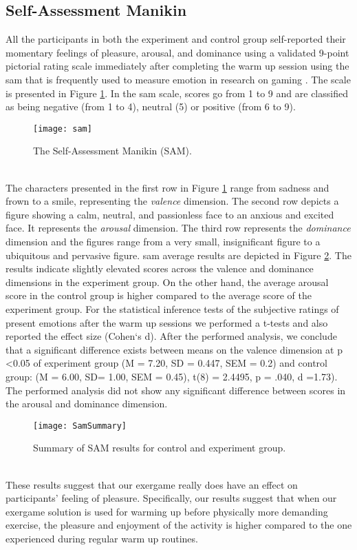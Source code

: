 \subsection{Self-Assessment Manikin}
All the participants in both the experiment and control group self-reported their momentary feelings of pleasure, arousal, and dominance using a validated 9-point pictorial rating scale immediately after completing the warm up session using the \acrfull{sam} \cite{bradley1994measuring} that  is frequently used to measure emotion in research on gaming \cite{poels2012pleasure}. The scale is  presented in Figure \ref{fig:samoverview}. In the \acrshort{sam} scale, scores go from 1 to 9 and are classified as being negative (from 1 to 4), neutral (5) or positive (from 6 to 9).\\
\begin{figure}[h]
    \centering
    \texttt{[image: sam]}
    \caption{The Self-Assessment Manikin (SAM).}
    \label{fig:samoverview}
\end{figure}\\
The characters presented in the first row in Figure \ref{fig:samoverview} range from sadness and frown to
a smile, representing the \textit{valence} dimension. The second row depicts a figure showing a calm, neutral, and passionless face to an anxious and excited face. It represents the \textit{arousal} dimension. The third row represents the \textit{dominance} dimension and the figures range from a very small, insignificant figure to a ubiquitous and pervasive figure. \acrshort{sam} average  results are depicted in Figure \ref{fig:sam}. The results  indicate slightly elevated scores across the valence and dominance
dimensions in the experiment group. On the other hand, the average arousal score in the control group is higher compared to the average score of the experiment group. 
For the statistical inference tests of the subjective ratings of present emotions after the warm up sessions we performed a t-tests and also reported the effect size (Cohen`s d). After the performed analysis, we conclude that a significant difference exists between means on the valence dimension at p \textless  0.05 of experiment group (M = 7.20, SD = 0.447, SEM = 0.2) and control group: (M = 6.00, SD= 1.00, SEM = 0.45), t(8) = 2.4495, p = .040, d =1.73).  The performed analysis did not show any significant difference between scores in the arousal and dominance dimension.\\
\begin{figure}[h]
    \centering
    \texttt{[image: SamSummary]}
    \caption{Summary of SAM results for control and experiment group.}
    \label{fig:sam}
\end{figure}\\
These results suggest that our exergame really does have an effect on participants' feeling of pleasure. Specifically, our results suggest that when our exergame solution is used for warming up before physically more demanding exercise, the pleasure and enjoyment of the activity is higher compared to the one experienced during regular warm up routines.\pagebreak
